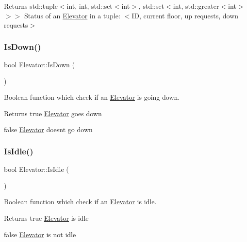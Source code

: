 \begin{DoxyReturn}{Returns}
std\+::tuple$<$int, int, std\+::set$<$int$>$, std\+::set$<$int, std\+::greater$<$int$>$$>$$>$ Status of an \mbox{\hyperlink{class_elevator}{Elevator}} in a tuple\+: $<$ID, current floor, up requests, down requests$>$ 
\end{DoxyReturn}
\mbox{\label{class_elevator_abc793c3aa503a743c3f1e1245f10d68b}} 
\subsubsection{\texorpdfstring{Is\+Down()}{IsDown()}}
{\footnotesize\ttfamily bool Elevator\+::\+Is\+Down (\begin{DoxyParamCaption}{ }\end{DoxyParamCaption})}



Boolean function which check if an \mbox{\hyperlink{class_elevator}{Elevator}} is going down. 

\begin{DoxyReturn}{Returns}
true \mbox{\hyperlink{class_elevator}{Elevator}} goes down 

false \mbox{\hyperlink{class_elevator}{Elevator}} doesn\textquotesingle{}t go down 
\end{DoxyReturn}
\mbox{\label{class_elevator_a3d253407ad2eae654d8fb5882b237ae4}} 
\subsubsection{\texorpdfstring{Is\+Idle()}{IsIdle()}}
{\footnotesize\ttfamily bool Elevator\+::\+Is\+Idle (\begin{DoxyParamCaption}{ }\end{DoxyParamCaption})}



Boolean function which check if an \mbox{\hyperlink{class_elevator}{Elevator}} is idle. 

\begin{DoxyReturn}{Returns}
true \mbox{\hyperlink{class_elevator}{Elevator}} is idle 

false \mbox{\hyperlink{class_elevator}{Elevator}} is not idle 
\end{DoxyReturn}
\mbox{\label{class_elevator_aca2748809b28064bd231bdd1d41da2c8}} 
